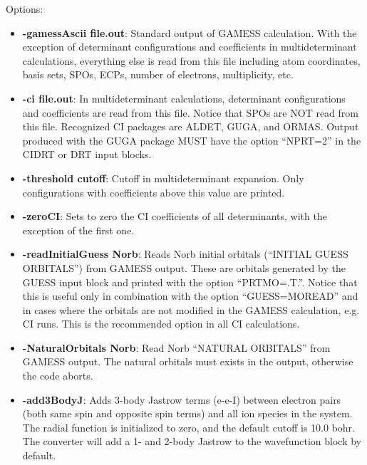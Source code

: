 Options:
\begin{itemize}
\item{\textbf{-gamessAscii file.out}: Standard output of GAMESS calculation. With the exception 
of determinant configurations and coefficients in multideterminant calculations,
everything else is read from this file including atom coordinates, basis sets, SPOs, ECPs, number of electrons, multiplicity, etc.}

\item{\textbf{-ci file.out}: In multideterminant calculations, determinant configurations and 
coefficients are read from this file. Notice that SPOs are NOT read
from this file. Recognized CI packages are ALDET, GUGA, and ORMAS. Output
produced with the GUGA package MUST have the option “NPRT=2” in the CIDRT
or DRT input blocks.}

\item{\textbf{-threshold cutoff}: Cutoff in multideterminant expansion. Only configurations with
coefficients above this value are printed.}

\item{\textbf{-zeroCI}: Sets to zero the CI coefficients of all determinants, with the exception of the
first one.}

\item{\textbf{-readInitialGuess Norb}: Reads Norb initial orbitals (“INITIAL GUESS ORBITALS”) 
from GAMESS output. These are orbitals generated by the GUESS input
block and printed with the option “PRTMO=.T.”. Notice that this is useful only in
combination with the option “GUESS=MOREAD” and in cases where the orbitals
are not modified in the GAMESS calculation, e.g. CI runs. This is the recommended
option in all CI calculations.}

\item{\textbf{-NaturalOrbitals Norb}: Read Norb “NATURAL ORBITALS” from GAMESS
output. The natural orbitals must exists in the output, otherwise the code aborts.}

\item{\textbf{-add3BodyJ}: Adds 3-body Jastrow terms (e-e-I) between electron pairs (both
same spin and opposite spin terms) and all ion species in the system. The radial
function is initialized to zero, and the default cutoff is 10.0 bohr. The converter will
add a 1- and 2-body Jastrow to the wavefunction block by default.}
\end{itemize}

